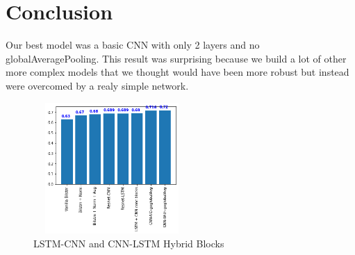 \documentclass[11pt]{article}
\begin{document}
\section{Conclusion}
Our best model was a basic CNN with only 2 layers and no globalAveragePooling.
This result was surprising because we build a lot of other more complex models that we thought would have been more robust but instead were overcomed by a realy simple network.
\begin{figure}[h]
  \centering
  \includegraphics[width=6cm, height=5cm]{chart}
  \caption{LSTM-CNN and CNN-LSTM Hybrid Blocks}
\end{figure}


\end{document}
